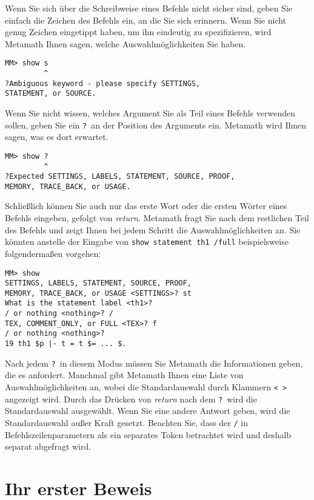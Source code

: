 Wenn Sie sich über die Schreibweise eines Befehls nicht sicher sind, geben Sie einfach die Zeichen des Befehls ein, an die Sie sich erinnern.
Wenn Sie nicht genug Zeichen eingetippt haben, um ihn eindeutig zu spezifizieren, wird Metamath Ihnen sagen, welche Auswahlmöglichkeiten Sie haben.

\begin{verbatim}
MM> show s
         ^
?Ambiguous keyword - please specify SETTINGS,
STATEMENT, or SOURCE.
\end{verbatim}

Wenn Sie nicht wissen, welches Argument Sie als Teil eines Befehls verwenden sollen, geben Sie ein \texttt{?}\index{\texttt{]}@\texttt{?}\ in Befehlszeilen}\ an der
Position des Arguments ein.  Metamath wird Ihnen sagen, was es dort erwartet.

\begin{verbatim}
MM> show ?
         ^
?Expected SETTINGS, LABELS, STATEMENT, SOURCE, PROOF,
MEMORY, TRACE_BACK, or USAGE.
\end{verbatim}

Schließlich können Sie auch nur das erste Wort oder die ersten Wörter eines Befehls eingeben, gefolgt von {\em return}.  Metamath fragt Sie nach dem restlichen Teil des Befehls und zeigt Ihnen bei jedem Schritt die Auswahlmöglichkeiten an. Sie könnten anstelle der Eingabe von \texttt{show statement th1 /full} beispielsweise folgendermaßen vorgehen:
\begin{verbatim}
MM> show
SETTINGS, LABELS, STATEMENT, SOURCE, PROOF,
MEMORY, TRACE_BACK, or USAGE <SETTINGS>? st
What is the statement label <th1>?
/ or nothing <nothing>? /
TEX, COMMENT_ONLY, or FULL <TEX>? f
/ or nothing <nothing>?
19 th1 $p |- t = t $= ... $.
\end{verbatim}

Nach jedem \texttt{?}\ in diesem Modus müssen Sie Metamath die Informationen geben, die es anfordert.  Manchmal gibt Metamath Ihnen eine Liste von Auswahlmöglichkeiten an, wobei die Standardauswahl durch Klammern \texttt{< > } angezeigt wird. Durch das Drücken von {\em return} nach dem \texttt{?}\, wird die Standardauswahl ausgewählt.
Wenn Sie eine andere Antwort geben, wird die Standardauswahl außer Kraft gesetzt.  Beachten Sie, dass der \texttt{/} in Befehlszeilenparametern als ein separates Token betrachtet wird und deshalb separat abgefragt wird.

\section{Ihr erster Beweis}\label{frstprf}

